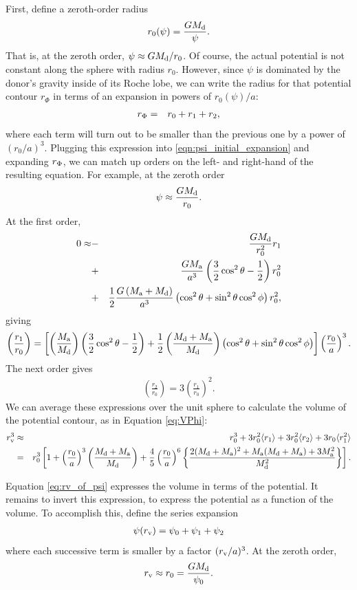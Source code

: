 \documentclass{aastex}
\newcommand{\be}{\begin{eqnarray}}
\newcommand{\ee}{\end{eqnarray}}
\begin{document}
First, define a zeroth-order radius
\be
r_0(\psi) = \frac{G M_{\rm d}}{\psi}.
\ee
That is, at the zeroth order, $\psi \approx G M_{\rm d}/r_0$. Of course, the actual potential is not constant along the sphere with radius $r_0$. However, since $\psi$ is dominated by the donor's gravity inside of its Roche lobe, we can write the radius for that potential contour $r_\Phi$ in terms of an expansion in powers of $r_0(\psi)/a$:
\be
r_{\rm \Phi} & =& r_0 + r_1 + r_2,
\ee
where each term will turn out to be smaller than the previous one by a power of $(r_0/a)^3$. Plugging this expression into \ref{eqn:psi_initial_expansion} and expanding $r_{\rm \Phi}$, we can match up orders on the left- and right-hand of the resulting equation. For example, at the zeroth order 
\be
\psi \approx \frac{G M_{\rm d}}{r_0}.
\label{eqn:r1}
\ee
At the first order,
\be
0 \approx &-&\frac{G M_{\rm d}}{r_0^2} r_1 \nonumber \\
& + & \frac{G M_{\rm a}}{a^3} \left( \frac{3}{2} \cos^2 \theta - \frac{1}{2} \right) r_0^2 \nonumber \\
& + & \frac{1}{2} \frac{G \left( M_{\rm a} + M_{\rm d} \right)}{a^3} \left( \cos^2 \theta + \sin^2 \theta \cos^2 \phi \right) r_0^2, 
\label{eqn:r1}
\ee
giving 
\be
\left( \frac{r_1}{r_0} \right) = \left[ \left( \frac{M_{\rm a}}{M_{\rm d}} \right) \left( \frac{3}{2} \cos^2 \theta - \frac{1}{2} \right) + \frac{1}{2} \left( \frac{M_{\rm d} + M_{\rm a}}{M_{\rm d}} \right) \left( \cos^2 \theta + \sin^2 \theta \cos^2 \phi \right) \right] \left( \frac{r_0}{a} \right)^3.
\ee
The next order gives 
\be
\left( \frac{r_2}{r_0} \right) = 3 \left( \frac{r_1}{r_0} \right)^2.
\label{eqn:r2}
\ee
We can average these expressions over the unit sphere to calculate the volume of the potential contour, as in Equation \ref{eq:VPhi}:
\begin{eqnarray}
r_{\rm v}^3 & \approx & r_0^3 + 3r_0^2 \langle r_1 \rangle + 3r_0^2 \langle r_2 \rangle + 3r_0 \langle r_1^2 \rangle \nonumber \\
& = & r_0^3 \left[ 1 + \left( \frac{r_0}{a} \right)^3 \left( \frac{ M_{\rm d}+M_{\rm a} }{ M_{\rm d} } \right) 
+ \frac{4}{5} \left( \frac{r_0}{a} \right)^6 \left\{ \frac{ 2(M_{\rm d}+M_{\rm a} )^2 + M_{\rm a} (M_{\rm d}+M_{\rm a} )
+ 3 M_{\rm a}^2}{M_{\rm d}^2} \right\} \right].
\label{eq:rv_of_psi}
\end{eqnarray}

Equation \ref{eq:rv_of_psi} expresses the volume in terms of the potential. It remains to invert this expression, to express the potential as a function of the volume. To accomplish this, define the series expansion
\be
\psi(r_{\rm v}) = \psi_0 + \psi_1 + \psi_2
\label{eq:psi_expansion}
\ee
where each successive term is smaller by a factor $(r_{\rm v}/a)^3$. At the zeroth order, 
\be
r_{\rm v} \approx r_0 = \frac{G M_{\rm d}}{\psi_0}.
\ee
\end{document}
